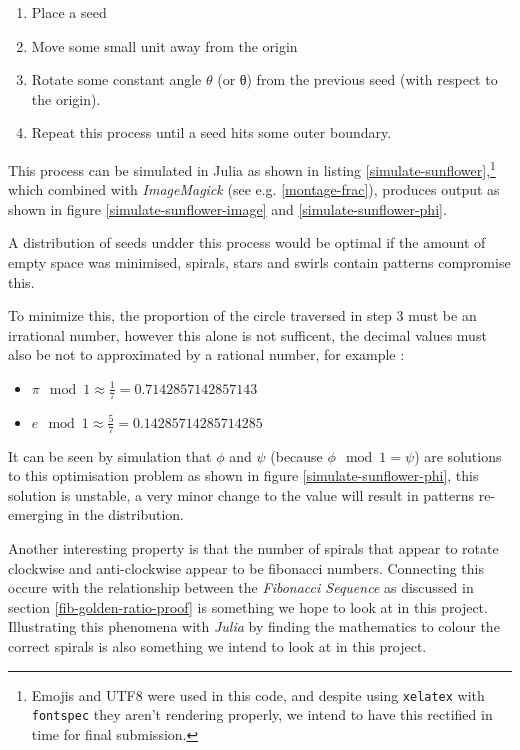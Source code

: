 \documentclass[11pt]{article}
\begin{document}
\begin{enumerate}
\item Place a seed
\item Move some small unit away from the origin
\item Rotate some constant angle \(\mathtt{\theta}\) (or θ) from the previous seed (with respect to the origin).
\item Repeat this process until a seed hits some outer boundary.
\end{enumerate}

This process can be simulated in Julia \cite{bezansonJuliaFreshApproach2017} as shown in listing \ref{simulate-sunflower},\footnote{Emojis and UTF8 were used in this code, and despite using \texttt{xelatex} with \texttt{fontspec} they aren't rendering properly, we intend to have this rectified in time for final submission.} which combined with \emph{ImageMagick} (see e.g. \ref{montage-frac}), produces output as shown in figure \ref{simulate-sunflower-image} and \ref{simulate-sunflower-phi}.

A distribution of seeds undder this process would be optimal if the amount of empty space was minimised, spirals, stars and swirls contain patterns compromise this.

To minimize this, the proportion of the circle traversed in step 3 must be an
irrational number, however this alone is not sufficent, the decimal values must
also be not to approximated by a rational number, for example
\cite{NatureGoldenRatio2018}:

\begin{itemize}
\item \(\pi \mod 1 \approx \frac{1}{7}=0.7142857142857143\)
\item \(e \mod 1 \approx \frac{5}{7}= 0.14285714285714285\)
\end{itemize}

It can be seen by simulation that \(\phi\) and \(\psi\) (because \(\phi \mod 1 =
\psi\)) are solutions to this optimisation problem as shown in figure
\ref{simulate-sunflower-phi}, this solution is unstable, a very minor change to the
value will result in patterns re-emerging in the distribution.

Another interesting property is that the number of spirals that appear to rotate
clockwise and anti-clockwise appear to be fibonacci numbers. Connecting this
occure with the relationship between the \emph{Fibonacci Sequence} as discussed in
section \ref{fib-golden-ratio-proof} is something we hope to look at in this project.
Illustrating this phenomena with \emph{Julia} by finding the mathematics to colour
the correct spirals is also something we intend to look at in this project.
\end{document}
